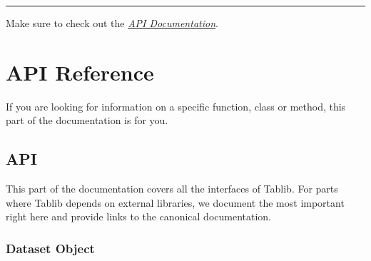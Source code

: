 \documentclass[a4paper,12pt,english]{sphinxmanual}
\begin{document}
\bigskip\hrule{}\bigskip


Make sure to check out the {\hyperref[api:api]{\emph{API Documentation}}}.


\part{API Reference}
\label{index:api-reference}
If you are looking for information on a specific function, class or
method, this part of the documentation is for you.


\chapter{API}
\label{api:api}\label{api::doc}\label{api:id1}\label{api:module-tablib}
This part of the documentation covers all the interfaces of Tablib.  For
parts where Tablib depends on external libraries, we document the most
important right here and provide links to the canonical documentation.


\section{Dataset Object}
\label{api:dataset-object}
\end{document}
